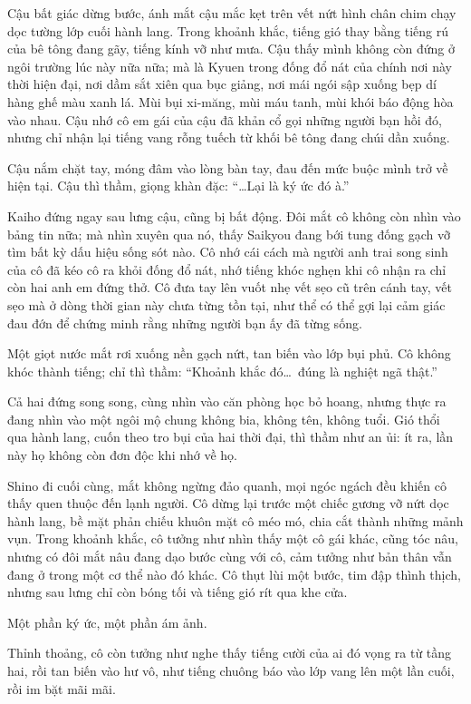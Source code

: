 \documentclass[../main.tex]{subfiles}
\begin{document}
Cậu bất giác dừng bước, ánh mắt cậu mắc kẹt trên vết nứt hình chân chim chạy dọc tường lớp cuối hành lang. Trong khoảnh khắc, tiếng gió thay bằng tiếng rú của bê tông đang gãy, tiếng kính vỡ như mưa. Cậu thấy mình không còn đứng ở ngôi trường lúc này nữa nữa; mà là Kyuen trong đống đổ nát của chính nơi này thời hiện đại, nơi dầm sắt xiên qua bục giảng, nơi mái ngói sập xuống bẹp dí hàng ghế màu xanh lá. Mùi bụi xi-măng, mùi máu tanh, mùi khói báo động hòa vào nhau. Cậu nhớ cô em gái của cậu đã khản cổ gọi những người bạn hồi đó, nhưng chỉ nhận lại tiếng vang rỗng tuếch từ khối bê tông đang chúi dần xuống.

Cậu nắm chặt tay, móng đâm vào lòng bàn tay, đau đến mức buộc mình trở về hiện tại. Cậu thì thầm, giọng khàn đặc: ``\dots Lại là ký ức đó à.''

Kaiho đứng ngay sau lưng cậu, cũng bị bất động. Đôi mắt cô không còn nhìn vào bảng tin nữa; mà nhìn xuyên qua nó, thấy Saikyou đang bới tung đống gạch vỡ tìm bất kỳ dấu hiệu sống sót nào. Cô nhớ cái cách mà người anh trai song sinh của cô đã kéo cô ra khỏi đống đổ nát, nhớ tiếng khóc nghẹn khi cô nhận ra chỉ còn hai anh em đứng thở. Cô đưa tay lên vuốt nhẹ vết sẹo cũ trên cánh tay, vết sẹo mà ở dòng thời gian này chưa từng tồn tại, như thể có thể gợi lại cảm giác đau đớn để chứng minh rằng những người bạn ấy đã từng sống.

Một giọt nước mắt rơi xuống nền gạch nứt, tan biến vào lớp bụi phủ. Cô không khóc thành tiếng; chỉ thì thầm: ``Khoảnh khắc đó\dots\ đúng là nghiệt ngã thật.''

Cả hai đứng song song, cùng nhìn vào căn phòng học bỏ hoang, nhưng thực ra đang nhìn vào một ngôi mộ chung không bia, không tên, không tuổi. Gió thổi qua hành lang, cuốn theo tro bụi của hai thời đại, thì thầm như an ủi: ít ra, lần này họ không còn đơn độc khi nhớ về họ.

Shino đi cuối cùng, mắt không ngừng đảo quanh, mọi ngóc ngách đều khiến cô thấy quen thuộc đến lạnh người. Cô dừng lại trước một chiếc gương vỡ nứt dọc hành lang, bề mặt phản chiếu khuôn mặt cô méo mó, chia cắt thành những mảnh vụn. Trong khoảnh khắc, cô tưởng như nhìn thấy một cô gái khác, cũng tóc nâu, nhưng có đôi mắt nâu đang dạo bước cùng với cô, cảm tưởng như bản thân vẫn đang ở trong một cơ thể nào đó khác. Cô thụt lùi một bước, tim đập thình thịch, nhưng sau lưng chỉ còn bóng tối và tiếng gió rít qua khe cửa.

Một phần ký ức, một phần ám ảnh.

Thỉnh thoảng, cô còn tưởng như nghe thấy tiếng cười của ai đó vọng ra từ tầng hai, rồi tan biến vào hư vô, như tiếng chuông báo vào lớp vang lên một lần cuối, rồi im bặt mãi mãi.
\end{document}
